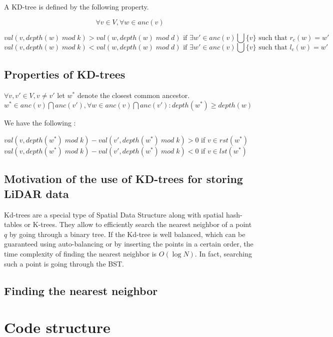 \documentclass[10pt,a4paper,final]{article}
\begin{document}
A KD-tree is defined by the following property.

\begin{equation*}
    \forall v \in V, \forall w \in anc(v)
\end{equation*}

\begin{equation*}
    val(v,depth(w)  \; mod \; k) > val( w, depth(w) \; mod  \; d) \text{ if } \exists w'\in anc(v) \bigcup \{v\} \text{ such that } r_c(w) = w'
\end{equation*}
\begin{equation*}
    val(v,depth(w)  \; mod \; k) < val( w, depth(w) \; mod  \; d) \text{ if } \exists w'\in anc(v) \bigcup \{v\} \text{ such that } l_c(w) = w'
\end{equation*}

\subsection{Properties of KD-trees}

$\forall v,v' \in V, v \neq v'$ let $w^*$ denote the closest common ancestor. $w^* \in anc(v) \bigcap anc(v'), \forall w \in anc(v) \bigcap anc(v') : depth(w^*) \geq depth(w)$

We have the following : 

$val(v,depth(w^*) \; mod  \; k) - val(v', depth(w^*) \ mod \; k) >0 $ if $v \in rst(w^*)$
$ val(v,depth(w^*) \; mod  \; k) - val(v', depth(w^*) \ mod \; k) < 0 $ if $v \in lst(w^*) $

\subsection{Motivation of the use of KD-trees for storing LiDAR data}
Kd-trees are a special type of Spatial Data Structure along with spatial hash-tables or K-trees. They allow to efficiently search the nearest neighbor of a point $q$ by going through a binary tree. If the Kd-tree is well balanced, which can be guaranteed using auto-balancing or by inserting the points in a certain order, the time complexity of finding the nearest neighbor is $O(\log N)$. In fact, searching such a point is going through the BST.

\subsection{Finding the nearest neighbor}

\section{Code structure}
\end{document}
